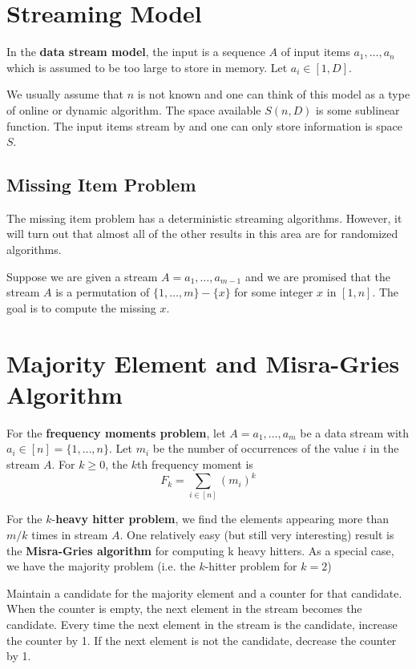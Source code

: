 \section{Streaming Model}

In the \textbf{data stream model}, the input is a sequence $A$ of input items $a_1,\ldots,a_n$ which is assumed to be too large to store in memory. Let $a_i \in [1,D]$.

We usually assume that $n$ is not known and one can think of this model as a type of online or dynamic algorithm. The space available $S(n,D)$ is some sublinear function. The input items stream by and one can only store information is space $S$.

\subsection{Missing Item Problem}

The missing item problem has a deterministic streaming algorithms. However, it will turn out that almost all of the other results in this area are for randomized algorithms.

Suppose we are given a stream $A = a_1,\ldots,a_{m-1}$ and we are promised that the stream $A$ is a permutation of $\{1,\ldots,m\} - \{x\}$ for some integer $x$ in $[1,n]$. The goal is to compute the missing $x$.

\section{Majority Element and Misra-Gries Algorithm}

For the \textbf{frequency moments problem}, let $A = a_1,\ldots,a_m$ be a data stream with $a_i \in [n] = \{1,\ldots,n\}$. Let $m_i$ be the number of occurrences of the value $i$ in the stream $A$. For $k \geq 0$, the $k$th frequency moment is
$$
F_k = \sum_{i \in [n]} (m_i)^k
$$

For the $k$-\textbf{heavy hitter problem}, we find the elements appearing more than $m / k$ times in stream $A$. One relatively easy (but still very interesting) result is the \textbf{Misra-Gries algorithm} for computing k heavy hitters. As a special case, we have the majority problem (i.e. the $k$-hitter problem for $k = 2$)

Maintain a candidate for the majority element and a counter for that candidate. When the counter is empty, the next element in the stream becomes the candidate. Every time the next element in the stream is the candidate, increase the counter by 1. If the next element is not the candidate, decrease the counter by 1.

